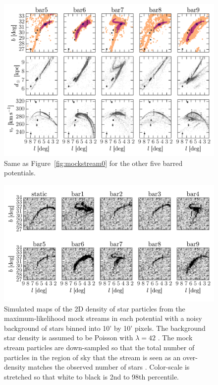 \begin{figure}[p]
\begin{center}
\includegraphics[width=\textwidth]{figures/ch4/mockstream1}
\caption{ Same as Figure~\ref{fig:mockstream0} for the other five barred potentials. }
\label{fig:mockstream1}
\end{center}
\end{figure}


\begin{figure}[p]
\begin{center}
\includegraphics[width=\textwidth]{figures/ch4/densitymaps}
\caption{ Simulated maps of the 2D density of star particles from the maximum-likelihood mock streams in each potential with a noisy background of stars binned into 10' by 10' pixels. The background star density is assumed to be Poisson with $\lambda = 42$ \citep[see Figure 3 in][where the typical background density is $\approx\frac{60}{(0.2~{\deg})^2}$]{bernard14}. The mock stream particles are down-sampled so that the total number of particles in the region of sky that the stream is seen as an over-density matches the observed number of stars \citep[$N\approx500$][]{bernard14}. Color-scale is stretched so that white to black is 2nd to 98th percentile.}
\label{fig:densitymaps}
\end{center}
\end{figure}

